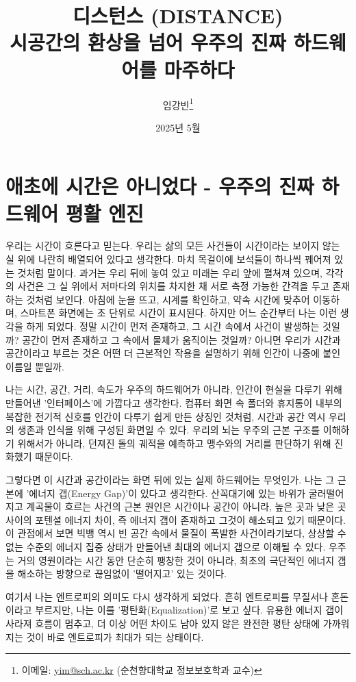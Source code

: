 \documentclass[12pt,a4paper]{article}
\title{\textbf{디스턴스 (DISTANCE)}\\ \Large 시공간의 환상을 넘어 우주의 진짜 하드웨어를 마주하다}
\author{임강빈\thanks{이메일: \href{mailto:yim@sch.ac.kr}{yim@sch.ac.kr} (순천향대학교 정보보호학과 교수)}}
\date{2025년 5월}
\begin{document}
\maketitle

\section{애초에 시간은 아니었다 - 우주의 진짜 하드웨어 평활 엔진}
우리는 시간이 흐른다고 믿는다. 우리는 삶의 모든 사건들이 시간이라는 보이지 않는 실 위에 나란히 배열되어 있다고 생각한다. 마치 목걸이에 보석들이 하나씩 꿰어져 있는 것처럼 말이다. 과거는 우리 뒤에 놓여 있고 미래는 우리 앞에 펼쳐져 있으며, 각각의 사건은 그 실 위에서 저마다의 위치를 차지한 채 서로 측정 가능한 간격을 두고 존재하는 것처럼 보인다. 아침에 눈을 뜨고, 시계를 확인하고, 약속 시간에 맞추어 이동하며, 스마트폰 화면에는 초 단위로 시간이 표시된다. 하지만 어느 순간부터 나는 이런 생각을 하게 되었다. 정말 시간이 먼저 존재하고, 그 시간 속에서 사건이 발생하는 것일까? 공간이 먼저 존재하고 그 속에서 물체가 움직이는 것일까? 아니면 우리가 시간과 공간이라고 부르는 것은 어떤 더 근본적인 작용을 설명하기 위해 인간이 나중에 붙인 이름일 뿐일까.

나는 시간, 공간, 거리, 속도가 우주의 하드웨어가 아니라, 인간이 현실을 다루기 위해 만들어낸 '인터페이스'에 가깝다고 생각한다. 컴퓨터 화면 속 폴더와 휴지통이 내부의 복잡한 전기적 신호를 인간이 다루기 쉽게 만든 상징인 것처럼, 시간과 공간 역시 우리의 생존과 인식을 위해 구성된 화면일 수 있다. 우리의 뇌는 우주의 근본 구조를 이해하기 위해서가 아니라, 던져진 돌의 궤적을 예측하고 맹수와의 거리를 판단하기 위해 진화했기 때문이다.

그렇다면 이 시간과 공간이라는 화면 뒤에 있는 실제 하드웨어는 무엇인가. 나는 그 근본에 '에너지 갭(Energy Gap)'이 있다고 생각한다. 산꼭대기에 있는 바위가 굴러떨어지고 계곡물이 흐르는 사건의 근본 원인은 시간이나 공간이 아니라, 높은 곳과 낮은 곳 사이의 포텐셜 에너지 차이, 즉 에너지 갭이 존재하고 그것이 해소되고 있기 때문이다. 이 관점에서 보면 빅뱅 역시 빈 공간 속에서 물질이 폭발한 사건이라기보다, 상상할 수 없는 수준의 에너지 집중 상태가 만들어낸 최대의 에너지 갭으로 이해될 수 있다. 우주는 거의 영원이라는 시간 동안 단순히 팽창한 것이 아니라, 최초의 극단적인 에너지 갭을 해소하는 방향으로 끊임없이 '떨어지고' 있는 것이다.

여기서 나는 엔트로피의 의미도 다시 생각하게 되었다. 흔히 엔트로피를 무질서나 혼돈이라고 부르지만, 나는 이를 '평탄화(Equalization)'로 보고 싶다. 유용한 에너지 갭이 사라져 흐름이 멈추고, 더 이상 어떤 차이도 남아 있지 않은 완전한 평탄 상태에 가까워지는 것이 바로 엔트로피가 최대가 되는 상태이다.
\end{document}
